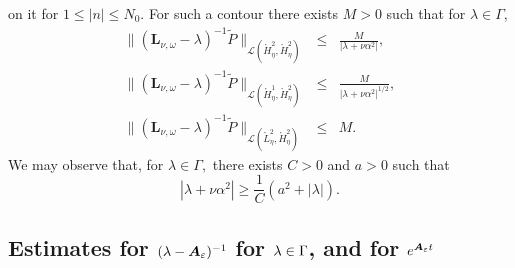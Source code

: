 \documentclass[11pt]{article}
\begin{document}
on it for $1\leq |n|\leq N_{0}$. For such a contour there exists $M>0$ such that for $\lambda \in
\Gamma$,
\begin{eqnarray*}
\|(\boldsymbol{L}_{\nu ,\omega }-\lambda )^{-1}\widetilde{P}\|_{\mathcal{L}(%
\mathring{H}_{\eta}^{2},\mathring{H}_{\eta}^{2})} &\leq &\frac{M}{|\lambda +\nu
\alpha ^{2}|}, \\
\|(\boldsymbol{L}_{\nu ,\omega }-\lambda )^{-1}\widetilde{P}\|_{\mathcal{L}(%
\mathring{H}_{\eta}^{1},\mathring{H}_{\eta}^{2})} &\leq &\frac{M}{|\lambda +\nu
\alpha ^{2}|^{1/2}}, \\
\|(\boldsymbol{L}_{\nu ,\omega }-\lambda )^{-1}\widetilde{P}\|_{\mathcal{L}(%
\mathring{L}_{\eta}^{2},\mathring{H}_{\eta}^{2})} &\leq &M.
\end{eqnarray*}%
We may observe that, for $\lambda \in \Gamma ,$ there exists $C>0$ and $a>0$
such that%
\begin{equation*}
|\lambda +\nu \alpha ^{2}|\geq \frac{1}{C}(a^{2}+|\lambda |).
\end{equation*}



\subsection{Estimates for $(\protect\lambda -\boldsymbol{A}_{\protect%
\varepsilon })^{-1}$ for $\protect\lambda \in \Gamma $, and for $e^{\boldsymbol{A}%
_{\protect\varepsilon }t}$ \label{App: estim semigrAeps}}

\end{document}
